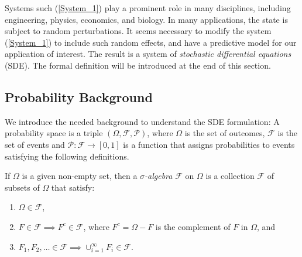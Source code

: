 Systems such (\ref{System_1}) play a prominent role in many disciplines, including engineering, physics, economics, and biology. In many applications,  the state is subject to random perturbations. It seems necessary to modify the system (\ref{System_1}) to include such random effects, and have a predictive model for our application of interest. The result is a system of \textit{stochastic differential equations} (SDE). The formal definition will be introduced at the end of this section.

\subsection{Probability Background}

We introduce the needed background to understand the SDE formulation: A probability space is a triple $(\Omega,\mathcal{F},\mathcal{P})$, where $\Omega$ is the set of outcomes, $\mathcal{F}$ is the set of events and $\mathcal{P}:\mathcal{F}\to[0,1]$ is a function that assigns probabilities to events satisfying the following definitions.

\begin{definition}
If $\Omega$ is a given non-empty set, then a \textit{$\sigma$-algebra} $\mathcal{F}$ on $\Omega$ is a collection $\mathcal{F}$ of subsets of $\Omega$ that satisfy:
\begin{enumerate}

\item $\Omega\in\mathcal{F}$,

\item $F\in\mathcal{F}\implies F^c\in\mathcal{F}$, where $F^c=\Omega-F$ is the complement of $F$ in $\Omega$, and

\item $F_1,F_2,\dots\in\mathcal{F}\implies\cup_{i=1}^{\infty}F_i\in\mathcal{F}$.

\end{enumerate}
\end{definition}

